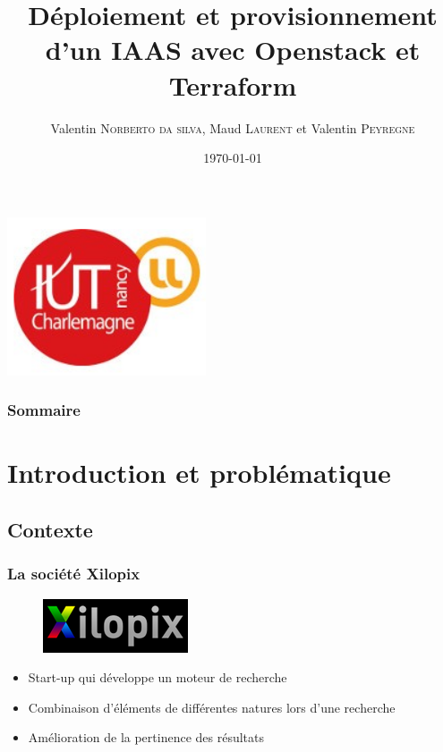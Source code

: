 \documentclass[11pt]{beamer} %
\title[Projet Tutoré]{Déploiement et provisionnement d’un IAAS avec Openstack et Terraform}
\author{Valentin \textsc{Norberto da silva}, Maud \textsc{Laurent} et Valentin \textsc{Peyregne}}
\institute{IUT Nancy Charlemagne}
\date{\today}
\begin{document}
	
		\begin{frame}
		\titlepage
			\begin{flushright}
				\includegraphics[scale=0.3]{logo.png}
			\end{flushright}			
		\end{frame}


		\begin{frame}
			\transdissolve[duration=2]
			\frametitle{Sommaire}
			\tableofcontents%
		\end{frame}


	\section{Introduction et problématique}
		
		
		\subsection{Contexte}
			\begin{frame}
				\frametitle{La société Xilopix}
					
				\begin{figure}
					\begin{center}
						\includegraphics[scale=0.8]{img2.png}
					\end{center}
				\end{figure}
				
				\begin{itemize}
					\item Start-up qui développe un moteur de recherche
					\item Combinaison d'éléments de différentes natures lors d'une recherche
					\item Amélioration de la pertinence des résultats
				\end{itemize}
			\end{frame}
		
\end{document}
